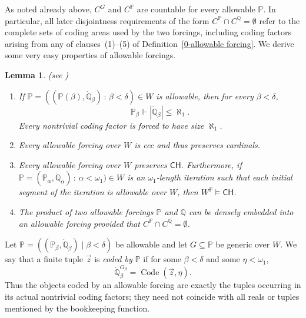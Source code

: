 \documentclass[a4paper,11pt]{article}
\newtheorem{lemma}[theorem]{Lemma}
\newcommand{\forceP}{\mathbb{P}}
\newcommand{\forceQ}{\mathbb{Q}}
\newcommand{\CH}{\mathsf{CH}}
\begin{document}
    As noted already above, $C^G$ and $C^{\forceP}$ are countable for every allowable $\forceP$. In particular, all later disjointness requirements of the form $C^{\forceP}\cap C^{\forceQ}=\emptyset$ refer to the complete sets of coding areas used by the two forcings, including coding factors arising from any of clauses~(1)--(5) of Definition~\ref{0-allowable forcing}. We derive some very easy properties of allowable forcings.
    
     \begin{lemma}(see \cite{Separation without reduction})
    
    
    
    \begin{enumerate}
    
    \item If $\forceP=((\forceP(\beta), \dot{\forceQ}_{\beta}) \, : \, \beta < \delta) \in W$ is allowable, then for every $\beta<\delta$,
    \[
    \forceP_\beta\Vdash |\dot{\forceQ}_\beta|\leq\aleph_1.
    \]
    Every nontrivial coding factor is forced to have size $\aleph_1$.
    
    \item Every allowable forcing over $W$ is ccc and thus preserves cardinals.
    
    \item Every allowable forcing over $W$ preserves $\CH$. Furthermore, if $\forceP= (\forceP_{\alpha},\dot{\forceQ}_{\alpha}) \, : \, \alpha < \omega_1) \in W$ is an $\omega_1$-length iteration such that each initial segment of the iteration is allowable over $W$, then $W^{\forceP} \models \CH$.
    
    \item The product of two allowable forcings $\forceP$ and $\forceQ$ can be densely embedded into an allowable forcing provided that $C^{\forceP} \cap C^{\forceQ}=\emptyset$.
    
    \end{enumerate}
    
    \end{lemma}
    
    
    
    Let $\forceP=((\forceP_\beta,\dot{\forceQ}_\beta)\mid\beta<\delta)$ be allowable and let $G\subseteq\forceP$ be generic over $W$. We say that a finite tuple $\vec z$ is \emph{coded by $\forceP$} if for some $\beta<\delta$ and some $\eta<\omega_1$,
    \[
    \dot{\forceQ}_\beta^{G_\beta}=\operatorname{Code}(\vec z,\eta).
    \]
    Thus the objects coded by an allowable forcing are exactly the tuples occurring in its actual nontrivial coding factors; they need not coincide with all reals or tuples mentioned by the bookkeeping function.
\end{document}
